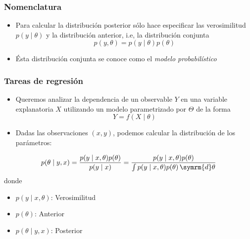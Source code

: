 \documentclass[xcolor=dvipsnames,10pt]{beamer}
\begin{document}
%
\begin{frame}
  \frametitle{Nomenclatura}
  \begin{itemize}
  \item Para calcular la distribución posterior sólo hace especificar las verosimilitud $p(y \mid \theta)$ y la distribución anterior, i.e, la distribución conjunta
    \begin{equation*}
      p(y, \theta) = p(y \mid \theta) p(\theta)
    \end{equation*}
  \item Ésta distribución conjunta se conoce como el \emph{modelo probabilístico}
  \end{itemize}
\end{frame}
%
\begin{frame}
  \frametitle{Tareas de regresión}
  \begin{itemize}
  \item Queremos analizar la dependencia de un observable $Y$ en una variable explanatoria $X$ utilizando un modelo parametrizado por $\Theta$ de la forma
  \begin{equation*}
    Y = f(X \mid \theta)
  \end{equation*}
\item Dadas las observaciones $(x, y)$, podemos calcular la distribución de los parámetros:
  \end{itemize}
  \begin{equation*}
    p(\theta \mid y, x) = \frac{p(y \mid x, \theta) p(\theta)}{p(y \mid x)} = \frac{p(y \mid x, \theta) p(\theta)}{\int p(y \mid x, \theta) p(\theta) \, \symrm{d} \theta}
  \end{equation*}
  donde
  \begin{itemize}
  \item $p(y \mid x, \theta)$: Verosimilitud
  \item $p(\theta)$: Anterior
  \item $p(\theta \mid y, x)$: Posterior
  \end{itemize}
\end{frame}
\end{document}
